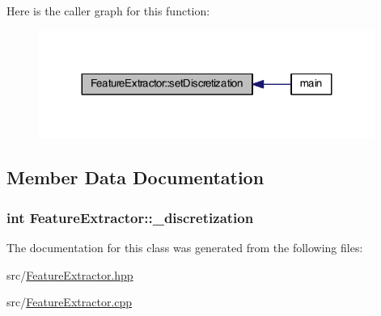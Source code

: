 Here is the caller graph for this function\+:\nopagebreak
\begin{figure}[H]
\begin{center}
\leavevmode
\includegraphics[width=311pt]{class_feature_extractor_a99ef3afd19f932dcb7dbb089e474d41b_icgraph}
\end{center}
\end{figure}




\subsection{Member Data Documentation}
\hypertarget{class_feature_extractor_a76b9438b85a119c2ec4126b75c0486bf}{
\subsubsection[{\+\_\+discretization}]{\setlength{\rightskip}{0pt plus 5cm}int Feature\+Extractor\+::\+\_\+discretization\hspace{0.3cm}{\ttfamily [private]}}}\label{class_feature_extractor_a76b9438b85a119c2ec4126b75c0486bf}


The documentation for this class was generated from the following files\+:\begin{DoxyCompactItemize}
\item 
src/\hyperlink{_feature_extractor_8hpp}{Feature\+Extractor.\+hpp}\item 
src/\hyperlink{_feature_extractor_8cpp}{Feature\+Extractor.\+cpp}\end{DoxyCompactItemize}
